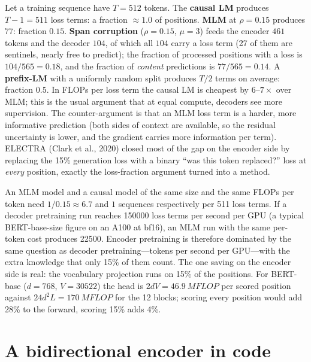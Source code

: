 \begin{napkinmath}
Let a training sequence have $T=512$ tokens. The \textbf{causal LM} produces $T-1=511$ loss terms:
a fraction $\approx 1.0$ of positions. \textbf{MLM} at $\rho=0.15$ produces $77$: fraction $0.15$.
\textbf{Span corruption} ($\rho=0.15$, $\mu=3$) feeds the encoder $461$ tokens and the decoder $104$,
of which all $104$ carry a loss term (27 of them are sentinels, nearly free to predict); the fraction
of processed positions with a loss is $104/565=0.18$, and the fraction of \emph{content} predictions
is $77/565=0.14$. A \textbf{prefix-LM} with a uniformly random split produces $T/2$ terms on average:
fraction $0.5$. In FLOPs per loss term the causal LM is cheapest by $6$--$7\times$ over MLM; this is
the usual argument that at equal compute, decoders see more supervision. The counter-argument is that
an MLM loss term is a harder, more informative prediction (both sides of context are available, so the
residual uncertainty is lower, and the gradient carries more information per term). ELECTRA (Clark
et al., 2020) closed most of the gap on the encoder side by replacing the 15\% generation loss with a
binary ``was this token replaced?'' loss at \emph{every} position, exactly the loss-fraction argument
turned into a method.
\end{napkinmath}

\begin{systemslens}
An MLM model and a causal model of the same size and the same FLOPs per token need $1/0.15\approx6.7$
and $1$ sequences respectively per 511 loss terms. If a decoder pretraining run reaches
\num{150000} loss terms per second per GPU (a typical BERT-base-size figure on an A100 at bf16), an
MLM run with the same per-token cost produces \num{22500}. Encoder pretraining is therefore
dominated by the same question as decoder pretraining---tokens per second per GPU---with the extra
knowledge that only 15\% of them count. The one saving on the encoder side is real: the vocabulary
projection runs on 15\% of the positions. For BERT-base ($d=768$, $V=\num{30522}$) the head is
$2dV=\SI{46.9}{MFLOP}$ per scored position against $24d^2L=\SI{170}{MFLOP}$ for the
12 blocks; scoring every position would add 28\% to the forward, scoring 15\% adds 4\%.
\end{systemslens}

\section{A bidirectional encoder in code}\label{sec:encoders:model}

